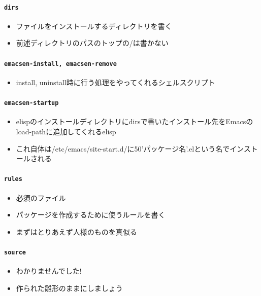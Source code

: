\documentclass[mingoth,a4paper]{jsarticle}
\begin{document}
\paragraph{\texttt{dirs}}
  \begin{itemize}
    \item ファイルをインストールするディレクトリを書く
    \item 前述ディレクトリのパスのトップの/は書かない
  \end{itemize}

\paragraph{\texttt{emacsen-install, emacsen-remove}}
  \begin{itemize}
    \item install, uninstall時に行う処理をやってくれるシェルスクリプト
  \end{itemize}

\paragraph{\texttt{emacsen-startup}}
  \begin{itemize}
    \item elispのインストールディレクトリにdirsで書いたインストール先をEmacsのload-pathに追加してくれるelisp
    \item これ自体は/etc/emacs/site-start.d/に50'パッケージ名'.elという名でインストールされる
  \end{itemize}

\paragraph{\texttt{rules}}
  \begin{itemize}
    \item 必須のファイル
    \item パッケージを作成するために使うルールを書く
    \item まずはとりあえず人様のものを真似る
  \end{itemize}

\paragraph{\texttt{source}}
  \begin{itemize}
    \item わかりませんでした!
    \item 作られた雛形のままにしましょう
  \end{itemize}
\end{document}
